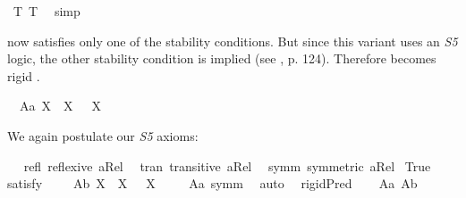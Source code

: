 \begin{isabellebody}
\ T{}\ T{}\ \isamarkupfalse%
\ simp%
%
%
%
\isamarkuptrue%
%
\begin{isamarkuptext}%
\isa{{\isasymP}} now satisfies only one of the stability conditions. But since this variant uses an \emph{S5} logic, 
the other stability condition is implied (see \cite{Fitting}, p. 124). Therefore \isa{{\isasymP}} becomes rigid .%
\end{isamarkuptext}\isamarkuptrue%
\isamarkupfalse%
\ \ A{}a{\isacharcolon}\ {\isachardoublequoteopen}{\isasymlfloor}\isactrlbold {\isasymforall}X{\isachardot}\ {\isasymP}\ X\ \isactrlbold {\isasymrightarrow}\ \isactrlbold {\isasymbox}{\isacharparenleft}{\isasymP}\ X{\isacharparenright}{\isasymrfloor}{\isachardoublequoteclose}%
\begin{isamarkuptext}%
We again postulate our \emph{S5} axioms:%
\end{isamarkuptext}\isamarkuptrue%
\isamarkupfalse%
\ \isanewline
\ refl{\isacharcolon}\ {\isachardoublequoteopen}reflexive\ aRel{\isachardoublequoteclose}\ \isanewline
\ tran{\isacharcolon}\ {\isachardoublequoteopen}transitive\ aRel{\isachardoublequoteclose}\ \isanewline
\ symm{\isacharcolon}\ {\isachardoublequoteopen}symmetric\ aRel{\isachardoublequoteclose}\isanewline
{}\isamarkupfalse%
\ True\ \isamarkupfalse%
{\isacharbrackleft}satisfy{\isacharbrackright}%
\ %
%
\isamarkupfalse%
\ %
%
%
%
\isanewline
\isanewline
{}\isamarkupfalse%
\ A{}b{\isacharcolon}\ {\isachardoublequoteopen}{\isasymlfloor}\isactrlbold {\isasymforall}X{\isachardot}\ \isactrlbold {\isasymnot}{\isacharparenleft}{\isasymP}\ X{\isacharparenright}\ \isactrlbold {\isasymrightarrow}\ \isactrlbold {\isasymbox}\isactrlbold {\isasymnot}{\isacharparenleft}{\isasymP}\ X{\isacharparenright}{\isasymrfloor}{\isachardoublequoteclose}\ \isanewline
%
\ \ %
%
\isamarkupfalse%
\ A{}a\ symm\ \isamarkupfalse%
\ auto\ %
%
%
\isanewline
%
\isamarkupfalse%
\ {\isachardoublequoteopen}{\isasymlfloor}rigidPred\ {\isasymP}{\isasymrfloor}{\isachardoublequoteclose}%
\ %
%
\isamarkupfalse%
\ A{}a\ A{}b\ \isamarkupfalse%

\end{isabellebody}
